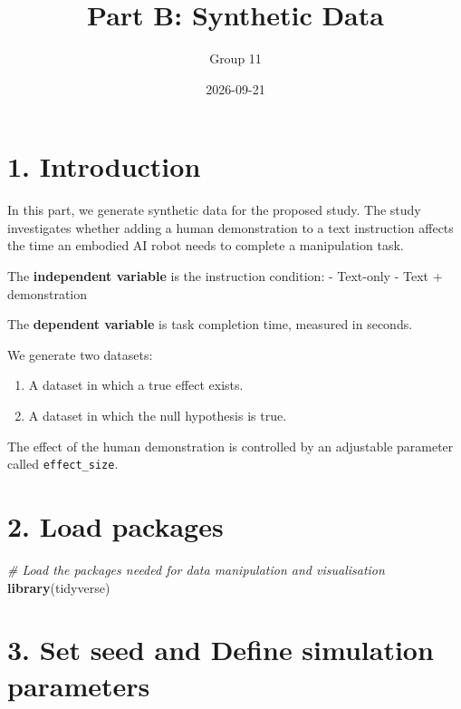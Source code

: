 \documentclass[
]{article}
\title{Part B: Synthetic Data}
\author{Group 11}
\date{2026-09-21}
\newenvironment{Shaded}{\begin{snugshade}}{\end{snugshade}}
\newcommand{\CommentTok}[1]{\textcolor[rgb]{0.56,0.35,0.01}{\textit{#1}}}
\newcommand{\FunctionTok}[1]{\textcolor[rgb]{0.13,0.29,0.53}{\textbf{#1}}}
\newcommand{\NormalTok}[1]{#1}
\providecommand{\tightlist}{%
  \setlength{\itemsep}{0pt}\setlength{\parskip}{0pt}}
\begin{document}
\maketitle

\section{1. Introduction}\label{introduction}

In this part, we generate synthetic data for the proposed study. The
study investigates whether adding a human demonstration to a text
instruction affects the time an embodied AI robot needs to complete a
manipulation task.

The \textbf{independent variable} is the instruction condition: -
Text-only - Text + demonstration

The \textbf{dependent variable} is task completion time, measured in
seconds.

We generate two datasets:

\begin{enumerate}
\def\labelenumi{\arabic{enumi}.}
\tightlist
\item
  A dataset in which a true effect exists.
\item
  A dataset in which the null hypothesis is true.
\end{enumerate}

The effect of the human demonstration is controlled by an adjustable
parameter called \texttt{effect\_size}.

\section{2. Load packages}\label{load-packages}

\begin{Shaded}
\begin{Highlighting}[]
\CommentTok{\# Load the packages needed for data manipulation and visualisation}
\FunctionTok{library}\NormalTok{(tidyverse)}
\end{Highlighting}
\end{Shaded}

\section{3. Set seed and Define simulation
parameters}\label{set-seed-and-define-simulation-parameters}
\end{document}
